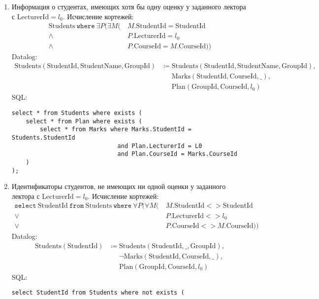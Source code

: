 \documentclass{article}
\newcommand{\Students}{\mathrm{Students}}
\newcommand{\StudentId}{\mathrm{StudentId}}
\newcommand{\StudentName}{\mathrm{StudentName}}
\newcommand{\GroupId}{\mathrm{GroupId}}
\newcommand{\CourseId}{\mathrm{CourseId}}
\newcommand{\Plan}{\mathrm{Plan}}
\newcommand{\LecturerId}{\mathrm{LecturerId}}
\newcommand{\Marks}{\mathrm{Marks}}
\newcommand{\select}{\mathtt{select}~}
\newcommand{\from}{~\mathtt{from}~}
\newcommand{\where}{~\mathtt{where}~}
\newcommand{\poloneq}{\mathrel{\phantom{\coloneq}}}
\begin{document}
\begin{enumerate}
\begin{enumerate}
\begin{verbatim}
    )
);
        \end{verbatim}
    \end{enumerate}
    \item Информация о студентах, имеющих хотя бы одну оценку у заданного
        лектора с $\LecturerId=l_0$.
    Исчисление кортежей:
    \begin{align*}
        \Students \where \exists P (\exists M (
        &\ M.\StudentId = \StudentId \\
        \land&\ P.\LecturerId = l_0 \\
        \land&\ P.\CourseId = M.\CourseId))
    \end{align*}
    Datalog:
    \begin{align*}
        \Students(\StudentId, \StudentName, \GroupId)
        &\coloneq \Students(\StudentId, \StudentName, \GroupId), \\
        &\poloneq \Marks(\StudentId, \CourseId, \_), \\
        &\poloneq \Plan(\GroupId, \CourseId, l_0)
    \end{align*}
    SQL:
    \begin{verbatim}
select * from Students where exists (
    select * from Plan where exists (
        select * from Marks where Marks.StudentId = Students.StudentId
                              and Plan.LecturerId = L0
                              and Plan.CourseId = Marks.CourseId
    )
);
    \end{verbatim}
    \item Идентификаторы студентов, не имеющих ни одной оценки у заданного
        лектора с $\LecturerId=l_0$.
    Исчисление кортежей:
    \begin{align*}
        \select \StudentId \from \Students \where
        \forall P (\forall M (
        &\  M.\StudentId <> \StudentId \\
        \lor&\ P.\LecturerId <> l_0 \\
        \lor&\ P.\CourseId <> M.\CourseId))
    \end{align*}
    Datalog:
    \begin{align*}
        \Students(\StudentId)
        &\coloneq \Students(\StudentId, \_, \GroupId), \\
        &\poloneq \neg \Marks(\StudentId, \CourseId, \_), \\
        &\poloneq \Plan(\GroupId, \CourseId, l_0)
    \end{align*}
    SQL:
    \begin{verbatim}
select StudentId from Students where not exists (

\end{verbatim}
\end{enumerate}
\end{document}
